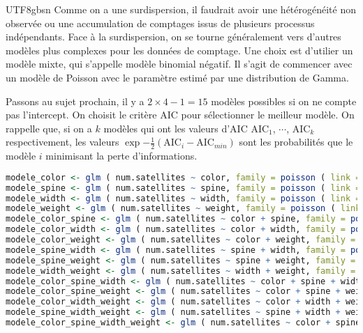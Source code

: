\documentclass[../main.tex]{subfiles}
\begin{document}
\begin{CJK*}{UTF8}{gbsn}
Comme on a une surdispersion, il faudrait avoir 
une hétérogénéité non observée ou une accumulation de comptages issus de plusieurs processus indépendants.
Face à la surdispersion, 
on se tourne généralement vers d'autres modèles plus complexes pour les données de comptage. 
Une choix est d'utilier un modèle mixte, qui s'appelle modèle binomial négatif. 
Il s'agit de commencer avec un modèle de Poisson
avec le paramètre estimé par une distribution de Gamma.

Passons au sujet prochain, il y a $2 \times 4-1=15$ modèles possibles si on ne compte pas l'intercept.
On choisit le critère AIC pour sélectionner le meilleur modèle.
On rappelle que, si on a $k$ modèles qui ont les valeurs d'AIC $\text{AIC}_1$, $\cdots$, $\text{AIC}_k$ respectivement,
les valeurs $\exp{-\frac{1}{2}(\text{AIC}_i - \text{AIC}_{min})}$ sont les probabilités que le modèle $i$
minimisant la perte d'informations.

\begin {lstlisting}[language=R]
modele_color <- glm ( num.satellites ~ color, family = poisson ( link = log ) ,data = hcrabs ) 
modele_spine <- glm ( num.satellites ~ spine, family = poisson ( link = log ) ,data = hcrabs )
modele_width <- glm ( num.satellites ~ width, family = poisson ( link = log ) ,data = hcrabs )
modele_weight <- glm ( num.satellites ~ weight, family = poisson ( link = log ) ,data = hcrabs )
modele_color_spine <- glm ( num.satellites ~ color + spine, family = poisson ( link = log ) ,data = hcrabs )
modele_color_width <- glm ( num.satellites ~ color + width, family = poisson ( link = log ) ,data = hcrabs )
modele_color_weight <- glm ( num.satellites ~ color + weight, family = poisson ( link = log ) ,data = hcrabs )
modele_spine_width <- glm ( num.satellites ~ spine + width, family = poisson ( link = log ) ,data = hcrabs )
modele_spine_weight <- glm ( num.satellites ~ spine + weight, family = poisson ( link = log ) ,data = hcrabs )
modele_width_weight <- glm ( num.satellites ~ width + weight, family = poisson ( link = log ) ,data = hcrabs )
modele_color_spine_width <- glm ( num.satellites ~ color + spine + width, family = poisson ( link = log ) ,data = hcrabs )
modele_color_spine_weight <- glm ( num.satellites ~ color + spine + weight, family = poisson ( link = log ) ,data = hcrabs )
modele_color_width_weight <- glm ( num.satellites ~ color + width + weight, family = poisson ( link = log ) ,data = hcrabs )
modele_spine_width_weight <- glm ( num.satellites ~ spine + width + weight, family = poisson ( link = log ) ,data = hcrabs )
modele_color_spine_width_weight <- glm ( num.satellites ~ color + spine + width + weight, family = poisson ( link = log ) ,data = hcrabs )


\end{lstlisting}
\end{CJK*}
\end{document}

